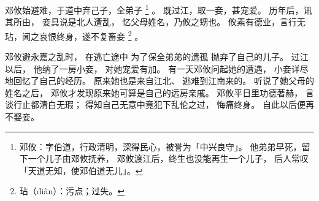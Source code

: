 
\switchcolumn*[\section{}]

邓攸始避难，于道中弃己子，全弟子%
\footnote{%
    邓攸：字伯道，行政清明，深得民心，被誉为「中兴良守」。
          他弟弟早死，留下一个儿子由邓攸抚养，
          邓攸渡江后，终生也没能再生一个儿子，
          后人常叹「天道无知，使邓伯道无儿」。
}%
。
既过江，取一妾，甚宠爱。
历年后，讯其所由，
妾具说是北人遭乱，
忆父母姓名，乃攸之甥也。
攸素有德业，言行无玷，闻之哀恨终身，遂不复畜妾%
\footnote{%
    玷（diàn）：污点；过失。
}%
。

\switchcolumn

邓攸避永嘉之乱时，
在逃亡途中
为了保全弟弟的遗孤
抛弃了自己的儿子。
过江以后，
他纳了一房小妾，
对她宠爱有加。
有一天邓攸问起她的遭遇，
小妾详尽地回忆了自己的经历。
原来她也是来自江北、
逃难到江南来的。
听说了她父母的姓名之后，
邓攸才发现原来她可算是自己的远房亲戚。
邓攸平日里功德著赫，
言谈行止都清白无瑕；
得知自己无意中竟犯下乱伦之过，
悔痛终身。
自此以后便再不娶妾。

